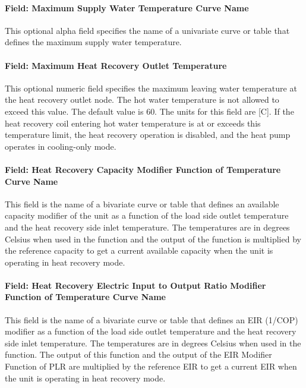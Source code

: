 \paragraph{Field: Maximum Supply Water Temperature Curve Name}\label{plhp_eir_cooling_inputs_maximum_supply_water_temperature_curve_name}

This optional alpha field specifies the name of a univariate curve or table that defines the maximum supply water temperature.

\paragraph{Field: Maximum Heat Recovery Outlet Temperature}\label{plhp_eir_cooling_inputs_maximum_heat_recovery_outlet_temperature}

This optional numeric field specifies the maximum leaving water temperature at the heat recovery outlet node. The hot water temperature is not allowed to exceed this value. The default value is 60. The units for this field are [C]. If the heat recovery coil entering hot water temperature is at or exceeds this temperature limit, the heat recovery operation is disabled, and the heat pump operates in cooling-only mode.

\paragraph{Field: Heat Recovery Capacity Modifier Function of Temperature Curve Name}\label{plhp_eir_cooling_inputs_heat_recovery_capft}

This field is the name of a bivariate curve or table that defines an available capacity modifier of the unit as a function of the load side outlet temperature and the heat recovery side inlet temperature. The temperatures are in degrees Celsius when used in the function and the output of the function is multiplied by the reference capacity to get a current available capacity when the unit is operating in heat recovery mode.

\paragraph{Field: Heat Recovery Electric Input to Output Ratio Modifier Function of Temperature Curve Name}\label{plhp_eir_cooling_inputs_heat_recovery_eirft}

This field is the name of a bivariate curve or table that defines an EIR (1/COP) modifier as a function of the load side outlet temperature and the heat recovery side inlet temperature. The temperatures are in degrees Celsius when used in the function. The output of this function and the output of the EIR Modifier Function of PLR are multiplied by the reference EIR to get a current EIR when the unit is operating in heat recovery mode.

